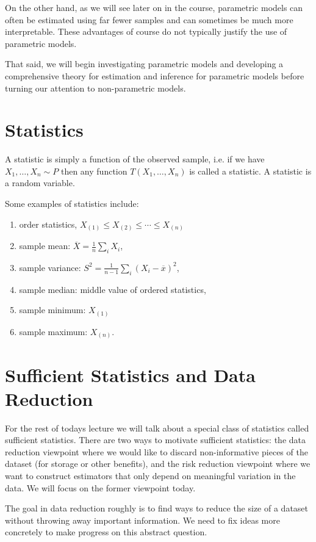 \documentclass[twoside,12pt]{article}
\begin{document}
On the other hand, as we will see later on in the course, parametric models can often be estimated using far fewer samples and can sometimes be much more interpretable. These advantages of course do not typically justify the use of parametric models. 


That said, we will begin investigating parametric models and developing a comprehensive theory for estimation and inference for parametric models before turning our attention to non-parametric models.


\section{Statistics}
A statistic is simply a function of the observed sample, i.e. if we have $X_1,\ldots,X_n \sim P$ then any function $T(X_1,\ldots,X_n)$ is called a statistic. A statistic is a random variable. 

Some examples of statistics include:
\begin{enumerate}
\item order statistics, $X_{(1)} \leq  X_{(2)} \leq \cdots \leq  X_{(n)}$
\item sample mean: $\overline{X}=\frac 1n\sum_i X_i$,
\item sample variance: $S^2=\frac{1}{n-1}\sum_i (X_i-\overline{x})^2$,
\item sample median: middle value of ordered statistics, 
\item sample minimum: $X_{(1)}$
\item sample maximum: $X_{(n)}$.
\end{enumerate}

\section{Sufficient Statistics and Data Reduction}
For the rest of todays lecture we will talk about a special class of statistics called sufficient statistics. There are two ways to motivate sufficient statistics: the data reduction viewpoint where we would like to discard non-informative pieces of the dataset (for storage or other benefits), and the risk reduction viewpoint where we want to construct estimators that only depend on meaningful variation in the data. We will focus on the former viewpoint today.

The goal in data reduction roughly is to find ways to reduce the size of a dataset without throwing away important information. We need to fix ideas more concretely to make progress on this abstract question. 
\end{document}
